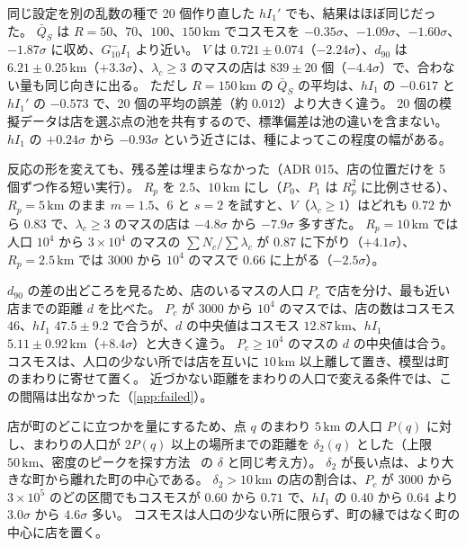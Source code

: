\documentclass[a4paper,11pt]{ltjsarticle}
\begin{document}
同じ設定を別の乱数の種で 20 個作り直した $hI_1'$ でも、結果はほぼ同じだった。
$\bar Q_S$ は $R = 50$、$70$、$100$、$150\,\mathrm{km}$ でコスモスを $-0.35\sigma$、$-1.09\sigma$、$-1.60\sigma$、$-1.87\sigma$ に収め、$G_{10}^{-}I_1$ より近い。
$V$ は $0.721 \pm 0.074$（$-2.24\sigma$）、$d_{90}$ は $6.21 \pm 0.25\,\mathrm{km}$（$+3.3\sigma$）、$\lambda_c \ge 3$ のマスの店は $839 \pm 20$ 個（$-4.4\sigma$）で、合わない量も同じ向きに出る。
ただし $R = 150\,\mathrm{km}$ の $\bar Q_S$ の平均は、$hI_1$ の $-0.617$ と $hI_1'$ の $-0.573$ で、20 個の平均の誤差（約 $0.012$）より大きく違う。
20 個の模擬データは店を選ぶ点の池を共有するので、標準偏差は池の違いを含まない。
$hI_1$ の $+0.24\sigma$ から $-0.93\sigma$ という近さには、種によってこの程度の幅がある。

反応の形を変えても、残る差は埋まらなかった（ADR 015、店の位置だけを 5 個ずつ作る短い実行）。
$R_p$ を $2.5$、$10\,\mathrm{km}$ にし（$P_0$、$P_1$ は $R_p^2$ に比例させる）、$R_p = 5\,\mathrm{km}$ のまま $m = 1.5$、$6$ と $s = 2$ を試すと、$V$（$\lambda_c \ge 1$）はどれも $0.72$ から $0.83$ で、$\lambda_c \ge 3$ のマスの店は $-4.8\sigma$ から $-7.9\sigma$ 多すぎた。
$R_p = 10\,\mathrm{km}$ では人口 $10^4$ から $3 \times 10^4$ のマスの $\sum N_c / \sum \lambda_c$ が $0.87$ に下がり（$+4.1\sigma$）、$R_p = 2.5\,\mathrm{km}$ では $3000$ から $10^4$ のマスで $0.66$ に上がる（$-2.5\sigma$）。

$d_{90}$ の差の出どころを見るため、店のいるマスの人口 $P_c$ で店を分け、最も近い店までの距離 $d$ を比べた。
$P_c$ が $3000$ から $10^4$ のマスでは、店の数はコスモス $46$、$hI_1$ $47.5 \pm 9.2$ で合うが、$d$ の中央値はコスモス $12.87\,\mathrm{km}$、$hI_1$ $5.11 \pm 0.92\,\mathrm{km}$（$+8.4\sigma$）と大きく違う。
$P_c \ge 10^4$ のマスの $d$ の中央値は合う。
コスモスは、人口の少ない所では店を互いに $10\,\mathrm{km}$ 以上離して置き、模型は町のまわりに寄せて置く。
近づかない距離をまわりの人口で変える条件では、この間隔は出なかった（\ref{app:failed}）。

店が町のどこに立つかを量にするため、点 $q$ のまわり $5\,\mathrm{km}$ の人口 $P(q)$ に対し、まわりの人口が $2P(q)$ 以上の場所までの距離を $\delta_2(q)$ とした（上限 $50\,\mathrm{km}$、密度のピークを探す方法~\cite{rodriguez2014} の $\delta$ と同じ考え方）。
$\delta_2$ が長い点は、より大きな町から離れた町の中心である。
$\delta_2 > 10\,\mathrm{km}$ の店の割合は、$P_c$ が $3000$ から $3 \times 10^5$ のどの区間でもコスモスが $0.60$ から $0.71$ で、$hI_1$ の $0.40$ から $0.64$ より $3.0\sigma$ から $4.6\sigma$ 多い。
コスモスは人口の少ない所に限らず、町の縁ではなく町の中心に店を置く。
\end{document}
